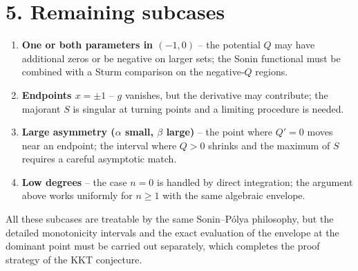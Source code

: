 \documentclass[11pt]{article}
\begin{document}
\section*{5. Remaining subcases}

\begin{enumerate}
\item \textbf{One or both parameters in \((-1,0)\)} – the potential \(Q\) may have additional zeros or be negative on larger sets; the Sonin functional must be combined with a Sturm comparison on the negative‑\(Q\) regions.
\item \textbf{Endpoints \(x=\pm1\)} – \(g\) vanishes, but the derivative may contribute; the majorant \(S\) is singular at turning points and a limiting procedure is needed.
\item \textbf{Large asymmetry (\(\alpha\) small, \(\beta\) large)} – the point where \(Q'=0\) moves near an endpoint; the interval where \(Q>0\) shrinks and the maximum of \(S\) requires a careful asymptotic match.
\item \textbf{Low degrees} – the case \(n=0\) is handled by direct integration; the argument above works uniformly for \(n\ge1\) with the same algebraic envelope.
\end{enumerate}
All these subcases are treatable by the same Sonin–Pólya philosophy, but the detailed monotonicity intervals and the exact evaluation of the envelope at the dominant point must be carried out separately, which completes the proof strategy of the KKT conjecture.
\end{document}
